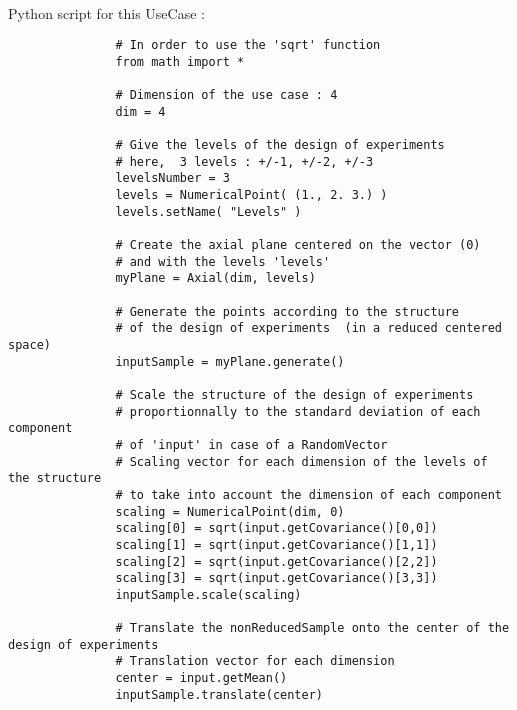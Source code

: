             \textspace\\
             Python script for this UseCase :

             \begin{lstlisting}
               # In order to use the 'sqrt' function
               from math import *

               # Dimension of the use case : 4
               dim = 4

               # Give the levels of the design of experiments
               # here,  3 levels : +/-1, +/-2, +/-3
               levelsNumber = 3
               levels = NumericalPoint( (1., 2. 3.) )
               levels.setName( "Levels" )

               # Create the axial plane centered on the vector (0)
               # and with the levels 'levels'
               myPlane = Axial(dim, levels)

               # Generate the points according to the structure
               # of the design of experiments  (in a reduced centered space)
               inputSample = myPlane.generate()

               # Scale the structure of the design of experiments
               # proportionnally to the standard deviation of each component
               # of 'input' in case of a RandomVector
               # Scaling vector for each dimension of the levels of the structure
               # to take into account the dimension of each component
               scaling = NumericalPoint(dim, 0)
               scaling[0] = sqrt(input.getCovariance()[0,0])
               scaling[1] = sqrt(input.getCovariance()[1,1])
               scaling[2] = sqrt(input.getCovariance()[2,2])
               scaling[3] = sqrt(input.getCovariance()[3,3])
               inputSample.scale(scaling)

               # Translate the nonReducedSample onto the center of the design of experiments
               # Translation vector for each dimension
               center = input.getMean()
               inputSample.translate(center)
             \end{lstlisting}
